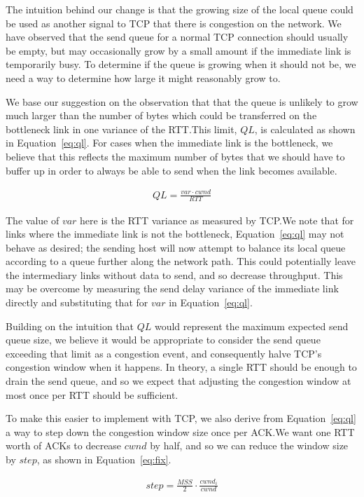 The intuition behind our change is that the growing size of the local queue
could be used as another signal to TCP that there is congestion on the network.
We have observed that the send queue for a normal TCP connection should usually
be empty, but may occasionally grow by a small amount if the immediate link is
temporarily busy. To determine if the queue is growing when it should not be, we
need a way to determine how large it might reasonably grow to.

We base our suggestion on the observation that that the queue is unlikely to
grow much larger than the number of bytes which could be transferred on the
bottleneck link in one variance of the RTT.\@ This limit, $QL$, is calculated as
shown in Equation~\ref{eq:ql}. For cases when the immediate link is the
bottleneck, we believe that this reflects the maximum number of bytes that we
should have to buffer up in order to always be able to send when the link
becomes available.

\begin{align}
  QL = \frac{var \cdot cwnd}{RTT}\label{eq:ql}
\end{align}

The value of $var$ here is the RTT variance as measured by TCP.\@ We note that
for links where the immediate link is not the bottleneck, Equation~\ref{eq:ql}
may not behave as desired; the sending host will now attempt to balance its
local queue according to a queue further along the network path. This could
potentially leave the intermediary links without data to send, and so decrease
throughput. This may be overcome by measuring the send delay variance of the
immediate link directly and substituting that for $var$ in Equation~\ref{eq:ql}.

Building on the intuition that $QL$ would represent the maximum expected send
queue size, we believe it would be appropriate to consider the send queue
exceeding that limit as a congestion event, and consequently halve TCP's
congestion window when it happens. In theory, a single RTT should be enough to
drain the send queue, and so we expect that adjusting the congestion window at
most once per RTT should be sufficient.

To make this easier to implement with TCP, we also derive from
Equation~\ref{eq:ql} a way to step down the congestion window size once per
ACK.\@ We want one RTT worth of ACKs to decrease $cwnd$ by half, and so we can
reduce the window size by $step$, as shown in Equation~\ref{eq:fix}.

\begin{align}
  step = \frac{MSS}{2} \cdot \frac{cwnd_i}{cwnd}\label{eq:fix}
\end{align}

